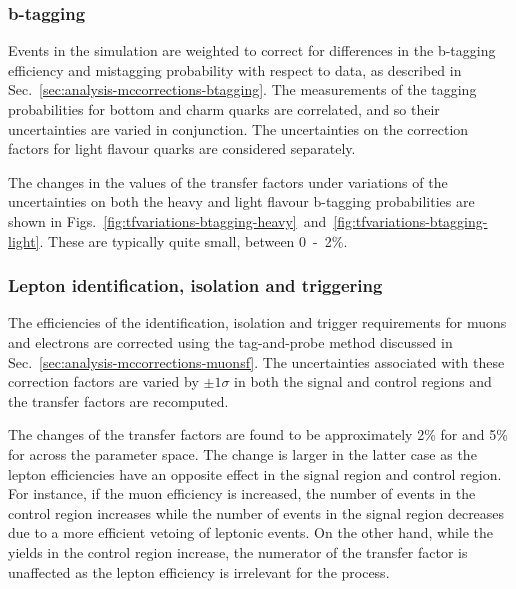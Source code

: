 \subsubsection{b-tagging}
Events in the simulation are weighted to correct for differences in the 
b-tagging efficiency and mistagging probability with respect to data, as 
described in Sec.~\ref{sec:analysis-mccorrections-btagging}. The measurements 
of the tagging probabilities for bottom and charm quarks are correlated, 
and so their uncertainties are varied in conjunction. 
The uncertainties on the correction factors for light flavour quarks are 
considered separately.

The changes in the values of the transfer factors under variations of the 
uncertainties on both the heavy and light flavour b-tagging probabilities are 
shown in 
Figs.~\ref{fig:tfvariations-btagging-heavy}~and~\ref{fig:tfvariations-btagging-light}.
 These are typically quite small, between 0~-~2\%.  

\subsubsection{Lepton identification, isolation and triggering}
The efficiencies of the identification, isolation and trigger requirements for 
muons and electrons are corrected using the tag-and-probe method discussed in 
Sec.~\ref{sec:analysis-mccorrections-muonsf}. The uncertainties associated with 
these correction factors are varied by $\pm1\sigma$ in both the signal and 
control regions and the transfer factors are recomputed. 

The changes of the transfer factors are found to be approximately 2\% for 
\Tmumutoz and 5\% for \Tmutottw across the \njnbht parameter space. The change 
is larger in the latter case as the lepton efficiencies have an opposite effect 
in the signal region and \mj control region. For instance, if the muon 
efficiency is increased, the number of events in the \mj control region 
increases while the number of \ttw events in the signal region decreases due to 
a more efficient vetoing of leptonic events. On the other hand, while the 
yields in the \mmj control region increase, the numerator of the \Tmumutoz 
transfer factor is unaffected as the lepton efficiency is irrelevant for the 
\znnj process.


